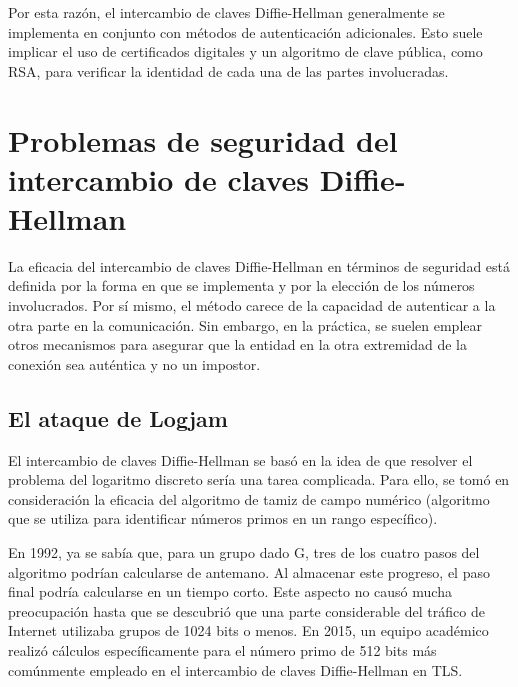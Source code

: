 \documentclass[11pt]{article}
\begin{document}
\begin{center}\end{center}

Por esta razón, el intercambio de claves Diffie-Hellman generalmente se implementa en conjunto con métodos de autenticación adicionales. Esto suele implicar el uso de certificados digitales y un algoritmo de clave pública, como RSA, para verificar la identidad de cada una de las partes involucradas.



\section{Problemas de seguridad del intercambio de claves Diffie-Hellman}
La eficacia del intercambio de claves Diffie-Hellman en términos de seguridad está definida por la forma en que se implementa y por la elección de los números involucrados. Por sí mismo, el método carece de la capacidad de autenticar a la otra parte en la comunicación. Sin embargo, en la práctica, se suelen emplear otros mecanismos para asegurar que la entidad en la otra extremidad de la conexión sea auténtica y no un impostor.

\subsection {El ataque de Logjam}

El intercambio de claves Diffie-Hellman se basó en la idea de que resolver el problema del logaritmo discreto sería una tarea complicada. Para ello, se tomó en consideración la eficacia del algoritmo de tamiz de campo numérico (algoritmo que se utiliza para identificar números primos en un rango específico).

\newpage

En 1992, ya se sabía que, para un grupo dado G, tres de los cuatro pasos del algoritmo podrían calcularse de antemano. Al almacenar este progreso, el paso final podría calcularse en un tiempo corto. Este aspecto no causó mucha preocupación hasta que se descubrió que una parte considerable del tráfico de Internet utilizaba grupos de 1024 bits o menos. En 2015, un equipo académico realizó cálculos específicamente para el número primo de 512 bits más comúnmente empleado en el intercambio de claves Diffie-Hellman en TLS.
\end{document}
